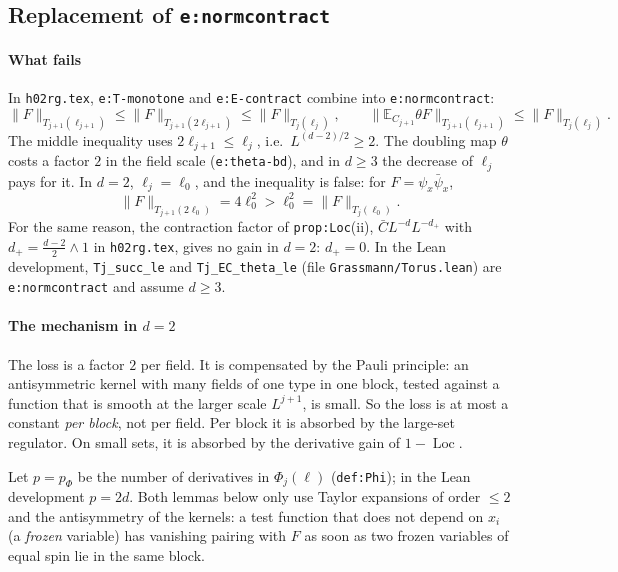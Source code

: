 \documentclass[11pt]{amsart}
\theoremstyle{definition}
\theoremstyle{remark}
\numberwithin{equation}{section}
\newcommand{\E}{\mathbb{E}}
\newcommand{\Loc}{\operatorname{Loc}}
\newcommand{\hr}{\texttt{h02rg.tex}}
\begin{document}
\subsection{Replacement of \texttt{e:normcontract}}
\label{sec:normcontract}

\paragraph{What fails}
In \hr{}, \texttt{e:T-monotone} and \texttt{e:E-contract} combine into \texttt{e:normcontract}:
\[
  \|F\|_{T_{j+1}(\ell_{j+1})}\le\|F\|_{T_{j+1}(2\ell_{j+1})}\le\|F\|_{T_j(\ell_j)},\qquad
  \|\E_{C_{j+1}}\theta F\|_{T_{j+1}(\ell_{j+1})}\le\|F\|_{T_j(\ell_j)} .
\]
The middle inequality uses $2\ell_{j+1}\le\ell_j$, i.e.\ $L^{(d-2)/2}\ge2$. The doubling map
$\theta$ costs a factor $2$ in the field scale (\texttt{e:theta-bd}), and in $d\ge3$ the
decrease of $\ell_j$ pays for it. In $d=2$, $\ell_j=\ell_0$, and the inequality is false: for
$F=\psi_x\bar\psi_x$,
\[
  \|F\|_{T_{j+1}(2\ell_0)}=4\ell_0^2>\ell_0^2=\|F\|_{T_j(\ell_0)} .
\]
For the same reason, the contraction factor of \texttt{prop:Loc}(ii),
$\bar CL^{-d}L^{-d_+}$ with $d_+=\frac{d-2}2\wedge1$ in \hr{}, gives no gain in $d=2$:
$d_+=0$. In the Lean development, \texttt{Tj\_succ\_le} and \texttt{Tj\_EC\_theta\_le} (file
\texttt{Grassmann/Torus.lean}) are \texttt{e:normcontract} and assume $d\ge3$.

\paragraph{The mechanism in $d=2$}
The loss is a factor $2$ per field. It is compensated by the Pauli principle: an
antisymmetric kernel with many fields of one type in one block, tested against a function
that is smooth at the larger scale $L^{j+1}$, is small. So the loss is at most a constant
\emph{per block}, not per field. Per block it is absorbed by the large-set regulator. On small
sets, it is absorbed by the derivative gain of $1-\Loc$.

Let $p=p_\Phi$ be the number of derivatives in $\Phi_j(\ell)$ (\texttt{def:Phi}); in the Lean
development $p=2d$. Both lemmas below only use Taylor expansions of order $\le2$ and the
antisymmetry of the kernels: a test function that does not depend on $x_i$ (a \emph{frozen}
variable) has vanishing pairing with $F$ as soon as two frozen variables of equal spin lie in
the same block.
\end{document}
